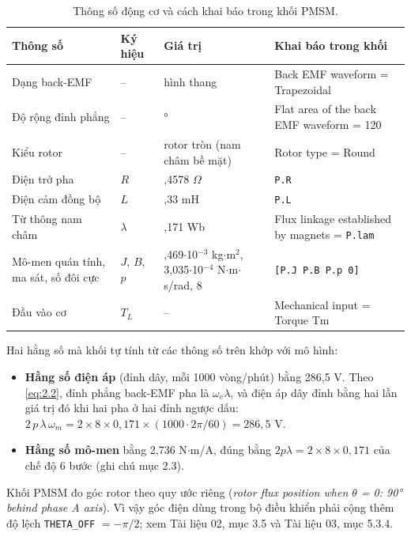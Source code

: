 \begin{table}[H]
\centering\small
\caption{Thông số động cơ và cách khai báo trong khối PMSM.}\label{tab:2.1}
\begin{tabularx}{\linewidth}{@{}>{\raggedright\arraybackslash}Xl>{\raggedright\arraybackslash}X>{\raggedright\arraybackslash}X@{}}
\toprule
Thông số & Ký hiệu & Giá trị & Khai báo trong khối \\ \midrule
Dạng back-EMF & – & hình thang & Back EMF waveform = Trapezoidal \\
Độ rộng đỉnh phẳng & – & 120° & Flat area of the back EMF waveform = 120 \\
Kiểu rotor & – & rotor tròn (nam châm bề mặt) & Rotor type = Round \\
Điện trở pha & $R$ & 0,4578 $\Omega$ & \texttt{P.R} \\
Điện cảm đồng bộ & $L$ & 3,33 mH & \texttt{P.L} \\
Từ thông nam châm & $\lambda$ & 0,171 Wb & Flux linkage established by magnets = \texttt{P.lam} \\
Mô-men quán tính, ma sát, số đôi cực & $J$, $B$, $p$ & 1,469$\cdot$10$^{-3}$ kg$\cdot$m$^2$, 3,035$\cdot$10$^{-4}$ N$\cdot$m$\cdot$s/rad, 8 & \texttt{[P.J P.B P.p 0]} \\
Đầu vào cơ & $T_L$ & – & Mechanical input = Torque Tm \\
\bottomrule
\end{tabularx}
\end{table}

Hai hằng số mà khối tự tính từ các thông số trên khớp với mô hình:

\begin{itemize}[leftmargin=*]
\item \textbf{Hằng số điện áp} (đỉnh dây, mỗi 1000 vòng/phút) bằng 286,5 V. Theo \eqref{eq:2.2}, đỉnh phẳng back-EMF pha là $\omega_e\lambda$, và điện áp dây đỉnh bằng hai lần giá trị đó khi hai pha ở hai đỉnh ngược dấu: $2\,p\,\lambda\,\omega_m = 2\times 8\times 0{,}171\times(1000\cdot 2\pi/60) = 286{,}5$ V.
\item \textbf{Hằng số mô-men} bằng 2,736 N$\cdot$m/A, đúng bằng $2p\lambda = 2\times 8\times 0{,}171$ của chế độ 6 bước (ghi chú mục 2.3).
\end{itemize}

Khối PMSM đo góc rotor theo quy ước riêng (\emph{rotor flux position when $\theta$ = 0: 90° behind phase A axis}). Vì vậy góc điện dùng trong bộ điều khiển phải cộng thêm độ lệch \texttt{THETA\_OFF} $= -\pi/2$; xem Tài liệu 02, mục 3.5 và Tài liệu 03, mục 5.3.4.

